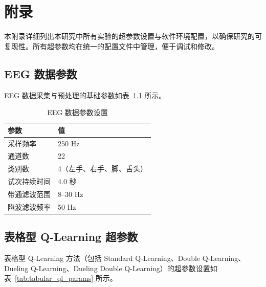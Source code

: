 
\chapter{附录}
\label{chap:appendix}

本附录详细列出本研究中所有实验的超参数设置与软件环境配置，以确保研究的可复现性。所有超参数均在统一的配置文件中管理，便于调试和修改。

\section{EEG 数据参数}
\label{sec:eeg_params}

EEG 数据采集与预处理的基础参数如表~\ref{tab:eeg_params} 所示。

\begin{table}[H]
\centering
\caption{EEG 数据参数设置}
\label{tab:eeg_params}
\begin{tabular}{ll}
\hline
\textbf{参数} & \textbf{值} \\
\hline
采样频率 & 250 Hz \\
通道数 & 22 \\
类别数 & 4（左手、右手、脚、舌头） \\
试次持续时间 & 4.0 秒 \\
带通滤波范围 & 8--30 Hz \\
陷波滤波频率 & 50 Hz \\
\hline
\end{tabular}
\end{table}

\section{表格型 Q-Learning 超参数}
\label{sec:tabular_ql_params}

表格型 Q-Learning 方法（包括 Standard Q-Learning、Double Q-Learning、Dueling Q-Learning、Dueling Double Q-Learning）的超参数设置如表~\ref{tab:tabular_ql_params} 所示。

